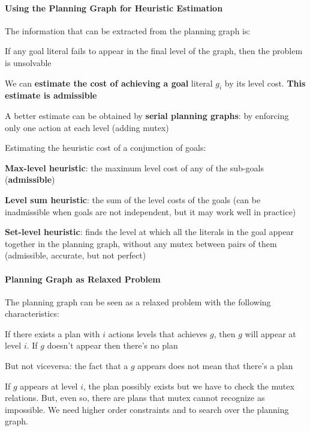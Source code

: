 \documentclass[10pt]{report}
\begin{document}
\paragraph{Using the Planning Graph for Heuristic Estimation} The information that can be extracted from the planning graph is:
\begin{list}{}{}
	\item If any goal literal fails to appear in the final level of the graph, then the problem is unsolvable
	\item We can \textbf{estimate the cost of achieving a goal} literal $g_i$ by its level cost. \textbf{This estimate is admissible}
	\item A better estimate can be obtained by \textbf{serial planning graphs}: by enforcing only one action at each level (adding mutex)
\end{list}
Estimating the heuristic cost of a conjunction of goals:\begin{list}{}{}
	\item \textbf{Max-level heuristic}: the maximum level cost of any of the sub-goals (\textbf{admissible})
	\item \textbf{Level sum heuristic}: the sum of the level costs of the goals (can be inadmissible when
goals are not independent, but it may work well in practice)
	\item \textbf{Set-level heuristic}: finds the level at which all the literals in the goal appear together in the planning graph, without any mutex between pairs of them (admissible, accurate, but not
perfect)
\end{list}
\paragraph{Planning Graph as Relaxed Problem} The planning graph can be seen as a relaxed problem with the following characteristics:
\begin{list}{}{}
	\item If there exists a plan with $i$ actions levels that achieves $g$, then $g$ will appear at level $i$. If $g$ doesn't appear then there's no plan
	\item But not viceversa: the fact that a $g$ appears does not mean that there's a plan
\end{list}
If $g$ appears at level $i$, the plan possibly exists but we have to check the mutex relations. But, even so, there are plans that mutex cannot recognize as impossible. We need higher order constraints and to search over the planning graph.
\end{document}
